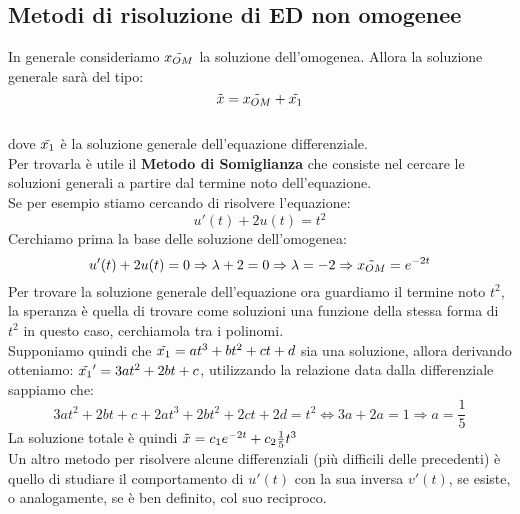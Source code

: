 \documentclass[a4paper,twoside]{article}
\theoremstyle{definition}
\numberwithin{theorem}{section}
\begin{document}
\subsection{Metodi di risoluzione di ED non omogenee}
In generale consideriamo $\Tilde{x_{OM}}$ la soluzione dell'omogenea. Allora la soluzione generale sarà del tipo: $$\Tilde{x}= \Tilde{x_{OM}}+ \Tilde{x_1}$$\\
dove $\Tilde{x_1}$ è la soluzione generale dell'equazione differenziale.\\
Per trovarla è utile il \textbf{Metodo di Somiglianza} che consiste nel cercare le soluzioni generali a partire dal termine noto dell'equazione.\\
Se per esempio stiamo cercando di risolvere l'equazione:
$$u'(t)+2u(t)=t^2$$
Cerchiamo prima la base delle soluzione dell'omogenea:$$u'(t)+2u(t)=0\Rightarrow \lambda +2 =0 \Rightarrow \lambda=-2 \Rightarrow \Tilde{x_{OM}}=e^{-2t}$$
Per trovare la soluzione generale dell'equazione ora guardiamo il termine noto $t^2$, la speranza è quella di trovare come soluzioni una funzione della stessa forma di $t^2$ in questo caso, cerchiamola tra i polinomi.\\
Supponiamo quindi che $\Tilde{x_1}=at^3+bt^2+ct+d$ sia una soluzione, allora derivando otteniamo: $\Tilde{x_1}'=3at^2+2bt+c$, utilizzando la relazione data dalla differenziale sappiamo che:
$$3at^2+2bt+c + 2at^3+2bt^2+2ct+2d=t^2\Leftrightarrow 3a+2a=1\Rightarrow a=\frac{1}{5}$$
La soluzione totale è quindi $\Tilde{x}= c_1e^{-2t}+c_2\frac{1}{5}t^3$\\
Un altro metodo per risolvere alcune differenziali (più difficili delle precedenti) è quello di studiare il comportamento di $u'(t)$ con la sua inversa $v'(t)$, se esiste, o analogamente, se è ben definito, col suo reciproco.
\end{document}
